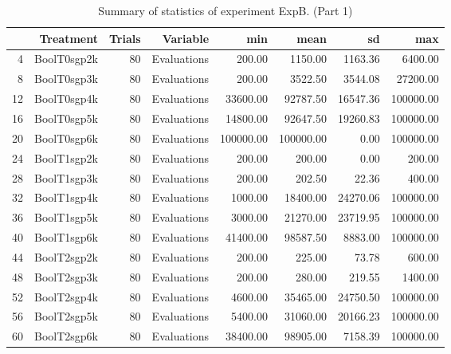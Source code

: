 \begin{table}[ht]
\centering
\begin{tabular}{rrrrrrrr}
  \hline
 & Treatment & Trials & Variable & min & mean & sd & max \\ 
  \hline
4 & BoolT0sgp2k &  80 & Evaluations & 200.00 & 1150.00 & 1163.36 & 6400.00 \\ 
  8 & BoolT0sgp3k &  80 & Evaluations & 200.00 & 3522.50 & 3544.08 & 27200.00 \\ 
  12 & BoolT0sgp4k &  80 & Evaluations & 33600.00 & 92787.50 & 16547.36 & 100000.00 \\ 
  16 & BoolT0sgp5k &  80 & Evaluations & 14800.00 & 92647.50 & 19260.83 & 100000.00 \\ 
  20 & BoolT0sgp6k &  80 & Evaluations & 100000.00 & 100000.00 & 0.00 & 100000.00 \\ 
  24 & BoolT1sgp2k &  80 & Evaluations & 200.00 & 200.00 & 0.00 & 200.00 \\ 
  28 & BoolT1sgp3k &  80 & Evaluations & 200.00 & 202.50 & 22.36 & 400.00 \\ 
  32 & BoolT1sgp4k &  80 & Evaluations & 1000.00 & 18400.00 & 24270.06 & 100000.00 \\ 
  36 & BoolT1sgp5k &  80 & Evaluations & 3000.00 & 21270.00 & 23719.95 & 100000.00 \\ 
  40 & BoolT1sgp6k &  80 & Evaluations & 41400.00 & 98587.50 & 8883.00 & 100000.00 \\ 
  44 & BoolT2sgp2k &  80 & Evaluations & 200.00 & 225.00 & 73.78 & 600.00 \\ 
  48 & BoolT2sgp3k &  80 & Evaluations & 200.00 & 280.00 & 219.55 & 1400.00 \\ 
  52 & BoolT2sgp4k &  80 & Evaluations & 4600.00 & 35465.00 & 24750.50 & 100000.00 \\ 
  56 & BoolT2sgp5k &  80 & Evaluations & 5400.00 & 31060.00 & 20166.23 & 100000.00 \\ 
  60 & BoolT2sgp6k &  80 & Evaluations & 38400.00 & 98905.00 & 7158.39 & 100000.00 \\ 
   \hline
\end{tabular}
\caption{Summary of statistics of experiment ExpB. (Part 1)} 
\end{table}
